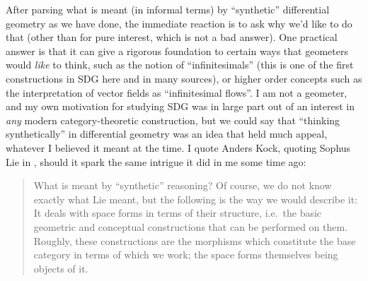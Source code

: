 After parsing what is meant (in informal terms) by ``synthetic'' differential geometry as we have done, the immediate reaction is to ask why we'd like to do that (other than for pure interest, which is not a bad answer). One practical answer is that it can give a rigorous foundation to certain ways that geometers would \emph{like} to think, such as the notion of ``infinitesimals'' (this is one of the first constructions in SDG here and in many sources), or higher order concepts such as the interpretation of vector fields as ``infinitesimal flows''. I am not a geometer, and my own motivation for studying SDG was in large part out of an interest in \emph{any} modern category-theoretic construction, but we could say that ``thinking synthetically'' in differential geometry was an idea that held much appeal, whatever I believed it meant at the time. I quote Anders Kock, quoting Sophus Lie in \cite{kock06}, should it spark the same intrigue it did in me some time ago:
\begin{quote}
  What is meant by “synthetic” reasoning? Of course, we do not know exactly what Lie meant, but the following is the way we would describe it: It deals with space forms in terms of their structure, i.e.\ the basic geometric and conceptual constructions that can be performed on them. Roughly, these constructions are the morphisms which constitute the base category in terms of which we work; the space forms themselves being objects of it.
\end{quote}
